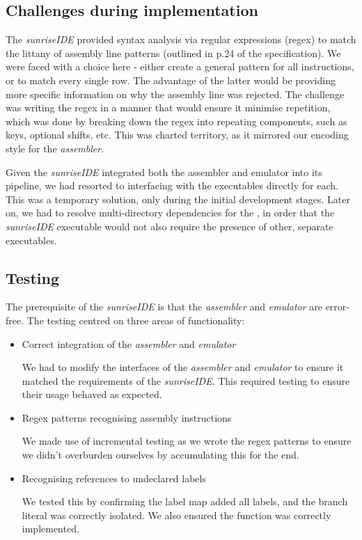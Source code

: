 \documentclass[11pt]{article}
\begin{document}
\subsection{Challenges during implementation}
The {\it sunriseIDE} provided syntax analysis via regular expressions (regex) to match the littany of assembly line patterns (outlined in p.24 of the specification). We were faced with a choice here - either create a general pattern for all instructions, or to match every single row. The advantage of the latter would be providing more specific information on why the assembly line was rejected. The challenge was writing the regex in a manner that would ensure it minimise repetition, which was done by breaking down the regex into repeating components, such as keys, optional shifts, etc. This was charted territory, as it mirrored our encoding style for the {\it assembler}.

Given the {\it sunriseIDE} integrated both the assembler and emulator into its pipeline, we had resorted to interfacing with the executables directly for each. This was a temporary solution, only during the initial development stages. Later on, we had to resolve multi-directory dependencies for the , in order that the {\it sunriseIDE} executable would not also require the presence of other, separate executables.

\subsection{Testing}
The prerequisite of the {\it sunriseIDE} is that the {\it assembler} and {\it emulator} are error-free. The testing centred on three areas of functionality:
\begin{itemize}
    \item Correct integration of the {\it assembler} and {\it emulator}

    We had to modify the interfaces of the {\it assembler} and {\it emulator} to ensure it matched the requirements of the {\it sunriseIDE}. This required testing to ensure their usage behaved as expected.
    \item Regex patterns recognising assembly instructions

    We made use of incremental testing as we wrote the regex patterns to ensure we didn't overburden ourselves by accumulating this for the end.
    \item Recognising references to undeclared labels

    We tested this by confirming the label map added all labels, and the branch literal was correctly isolated. We also ensured the  function was correctly implemented.
\end{itemize}
\end{document}
